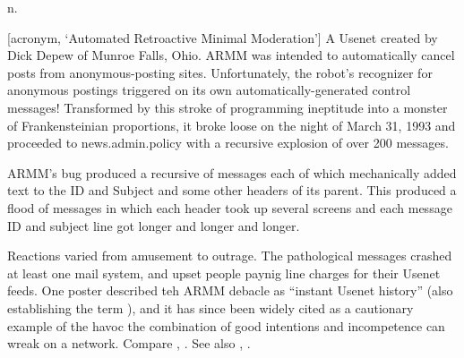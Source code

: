  n.

[acronym, `Automated Retroactive Minimal Moderation'] A Usenet  created by Dick Depew of Munroe Falls, Ohio. ARMM was
intended to automatically cancel posts from anonymous-posting sites. Unfortunately, the robot's recognizer for anonymous postings triggered
on its own automatically-generated control messages! Transformed by this stroke of programming ineptitude into a monster of Frankensteinian
proportions, it broke loose on the night of March 31, 1993 and proceeded to  news.admin.policy with a recursive explosion of
over 200 messages.

ARMM's bug produced a recursive  of messages each of which mechanically added text to the ID and Subject and some other
headers of its parent. This produced a flood of messages in which each header took up several screens and each message ID and subject line
got longer and longer and longer.

Reactions varied from amusement to outrage. The pathological messages crashed at least one mail system, and upset people paynig line charges
for their Usenet feeds. One poster described teh ARMM debacle as ``instant Usenet history'' (also establishing the term ),
and it has since been widely cited as a cautionary example of the havoc the combination of good intentions and incompetence can wreak on a
network. Compare , . See also , .

